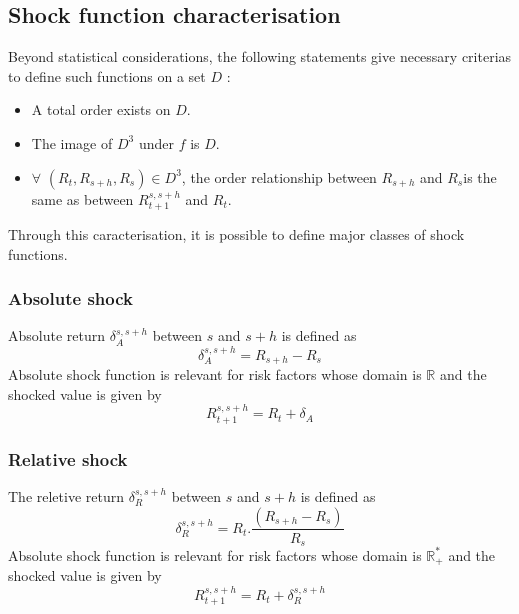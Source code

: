 \documentclass[10pt,a4paper]{report}
\begin{document}
\subsection{Shock function characterisation}
Beyond statistical
considerations, the following statements give necessary criterias to
define such functions on a set $D$ :

\bigskip

\begin{itemize}
\item A total order exists on $D.$
\item The image of $D^{3}$ under $f$ is $D.$
\item $\forall $ $(R_{t},R_{s+h},R_{s})\in D^{3}$, the order relationship
between $R_{s+h}$ and $R_{s}$is the same as between $R_{t+1}^{s,s+h}$ and $%
R_{t}.$
\end{itemize}

\bigskip 

Through this caracterisation, it is possible to define major classes of shock functions.

\subsubsection{Absolute shock}

Absolute return $\delta _{A}^{s,s+h}$ between $s$ and $s+h$ is defined as%
\begin{equation*}
\delta _{A}^{s,s+h}=R_{s+h}-R_{s}
\end{equation*}%
Absolute shock function is relevant for risk factors whose domain is $%
\mathbb{R}$ and the shocked value is given by 
\begin{equation*}
R_{t+1}^{s,s+h}=R_{t}+\delta _{A}
\end{equation*}

\subsubsection{Relative shock}

The reletive return $\delta _{R}^{s,s+h}$ between $s$ and $s+h$ is defined as%
\begin{equation*}
\delta _{R}^{s,s+h}=R_{t}.\frac{\left( R_{s+h}-R_{s}\right) }{R_{s}}
\end{equation*}%
Absolute shock function is relevant for risk factors whose domain is $%
\mathbb{R}_{+}^{\ast }$ and the shocked value is given by 
\begin{equation*}
R_{t+1}^{s,s+h}=R_{t}+\delta _{R}^{s,s+h}
\end{equation*}
\end{document}
